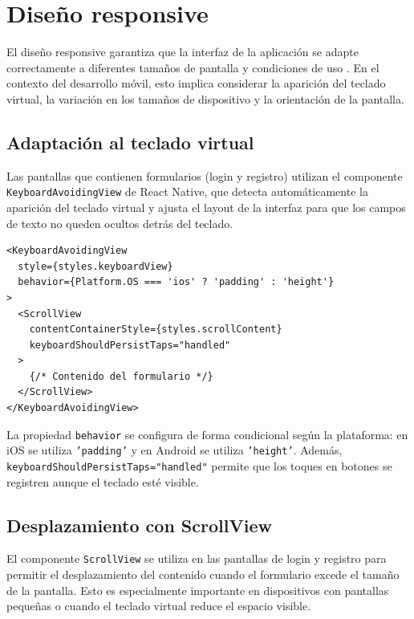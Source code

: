 
\section{Dise\~no responsive}

El dise\~no responsive garantiza que la interfaz de la aplicaci\'on se adapte
correctamente a diferentes tama\~nos de pantalla y condiciones de uso
\citep{nielsen1994, pressman2010}. En el contexto del desarrollo m\'ovil, esto
implica considerar la aparici\'on del teclado virtual, la variaci\'on en los
tama\~nos de dispositivo y la orientaci\'on de la pantalla.

\subsection{Adaptaci\'on al teclado virtual}

Las pantallas que contienen formularios (login y registro) utilizan el
componente \texttt{KeyboardAvoidingView} de React Native, que detecta
autom\'aticamente la aparici\'on del teclado virtual y ajusta el layout de la
interfaz para que los campos de texto no queden ocultos detr\'as del teclado.

\begin{lstlisting}
<KeyboardAvoidingView
  style={styles.keyboardView}
  behavior={Platform.OS === 'ios' ? 'padding' : 'height'}
>
  <ScrollView
    contentContainerStyle={styles.scrollContent}
    keyboardShouldPersistTaps="handled"
  >
    {/* Contenido del formulario */}
  </ScrollView>
</KeyboardAvoidingView>
\end{lstlisting}

La propiedad \texttt{behavior} se configura de forma condicional seg\'un la
plataforma: en iOS se utiliza \texttt{'padding'} y en Android se utiliza
\texttt{'height'}. Adem\'as, \texttt{keyboardShouldPersistTaps="handled"}
permite que los toques en botones se registren aunque el teclado est\'e
visible.

\subsection{Desplazamiento con ScrollView}

El componente \texttt{ScrollView} se utiliza en las pantallas de login y
registro para permitir el desplazamiento del contenido cuando el formulario
excede el tama\~no de la pantalla. Esto es especialmente importante en
dispositivos con pantallas peque\~nas o cuando el teclado virtual reduce el
espacio visible.


